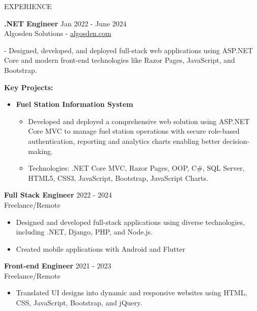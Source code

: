\documentclass{resume} %
\begin{document}
\begin{rSection}{EXPERIENCE}
	
	\textbf{.NET Engineer} \hfill Jan 2022 - June 2024\\
	Algosden Solutions -  \href{https://www.algosden.com/}{algosden.com}
		\itemsep 1pt {} 
		\item - Designed, developed, and deployed full-stack web applications using ASP.NET Core and modern front-end technologies like Razor Pages, JavaScript, and Bootstrap. 
		
		\item 
		\textbf{Key Projects:}
		\begin{itemize}
			\itemsep -3pt {} 
			\item \textbf{Fuel Station Information System}
			
			\begin{itemize}
				\itemsep -3pt {} 
				\item Developed and deployed a comprehensive web solution using ASP.NET Core MVC to manage fuel station operations with secure role-based authentication, reporting and analytics charts enabling better decision-making.

				\item Technologies: .NET Core MVC, Razor Pages, OOP, C\#, SQL Server, HTML5, CSS3, JavaScript, Bootstrap, JavaScript Charts.
			\end{itemize}
		\end{itemize}
	
		 
	
	\textbf{Full Stack Engineer} \hfill 2022 - 2024\\
	Freelance/Remote %
	\begin{itemize}
		\itemsep -3pt {} 
		\item Designed and developed full-stack applications using diverse technologies, including .NET, Django, PHP, and Node.js.
		\item Created mobile applications with Android and Flutter
	\end{itemize}
	
	
	\textbf{Front-end Engineer} \hfill 2021  - 2023\\
	Freelance/Remote  \hfill %
	\begin{itemize}
		\itemsep -3pt {} 
		\item Translated UI designs into dynamic and responsive websites using HTML, CSS, JavaScript, Bootstrap, and jQuery.
		

\end{itemize}
\end{rSection}
\end{document}
